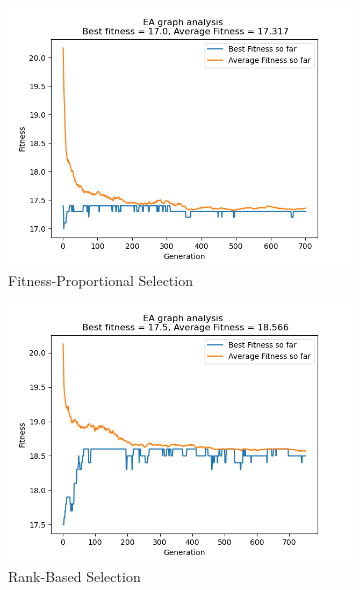 \documentclass[conference,compsoc]{IEEEtran}
\begin{document}
\begin{figure}[h!]
  \centering 
  \begin{subfigure}{0.34\textwidth}
    \includegraphics[width=\linewidth]{../Results/_23_FPS_Truncation_100_50_700.png}
    \caption{Fitness-Proportional Selection}
  \end{subfigure}
  \begin{subfigure}{0.34\textwidth}
    \includegraphics[width=\linewidth]{../Results/_23_RBS_Truncation_100_50_750.png}
    \caption{Rank-Based Selection}
  \end{subfigure}
  \label{fig:graphs2}
  \begin{subfigure}{0.34\textwidth}

\end{subfigure}
\end{figure}
\end{document}
